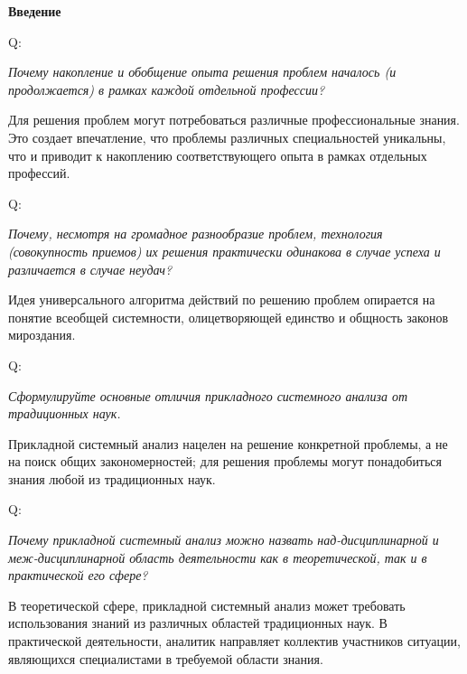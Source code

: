 \documentclass{article}
\renewcommand{\subsection}[1]{
	\vspace{2em}
	\begin{flushright}
		\large
		\textbf{#1}
	\end{flushright}
	}
\newcommand{\question}[2]{
	\begin{flushright}
		Q:\hspace{2ex}\vline\hspace{2ex}
		\begin{minipage}{0.9\textwidth}
			\large
			\textit{#1}
		\end{minipage}
	\end{flushright}
	\begin{center}
		\begin{minipage}{0.95\textwidth}
			#2
		\end{minipage}
	\end{center}
	}
\begin{document}
\subsection{Введение}
\question{Почему накопление и обобщение опыта решения проблем началось (и продолжается) в рамках каждой отдельной профессии?}{Для решения проблем могут потребоваться различные профессиональные знания. Это создает впечатление, что проблемы различных специальностей уникальны, что и приводит к накоплению соответствующего опыта в рамках отдельных профессий.}
\question{Почему, несмотря на громадное разнообразие проблем, технология (совокупность приемов) их решения практически одинакова в случае успеха и различается в случае неудач?}{Идея универсального алгоритма действий по решению проблем опирается на понятие всеобщей системности, олицетворяющей единство и общность законов мироздания.}
\question{Сформулируйте основные отличия прикладного системного анализа от традиционных наук.}{Прикладной системный анализ нацелен на решение конкретной проблемы, а не на поиск общих закономерностей; для решения проблемы могут понадобиться знания любой из традиционных наук.}
\question{Почему прикладной системный анализ можно назвать над-дисциплинарной и меж-дисциплинарной область деятельности как в теоретической, так и в практической его сфере?}{В теоретической сфере, прикладной системный анализ может требовать использования знаний из различных областей традиционных наук. В практической деятельности, аналитик направляет коллектив участников ситуации, являющихся специалистами в требуемой области знания.}
\end{document}
